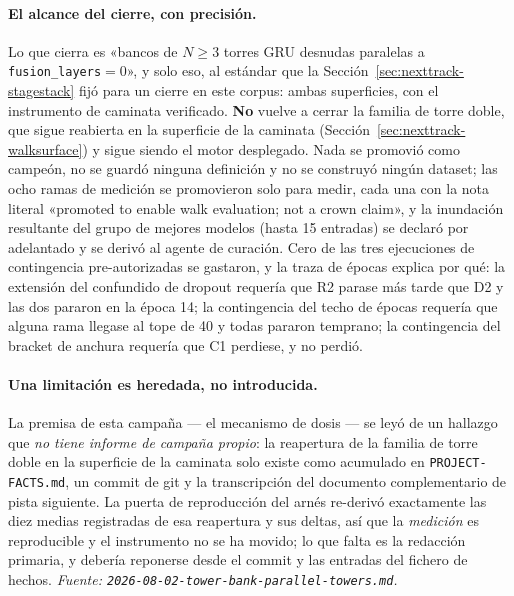\documentclass[11pt]{article}
\begin{document}
\paragraph{El alcance del cierre, con precisión.} Lo que cierra es «bancos de
$N\ge3$ torres GRU desnudas paralelas a \texttt{fusion\_layers}${}=0$», y solo
eso, al estándar que la Sección~\ref{sec:nexttrack-stagestack} fijó para un
cierre en este corpus: ambas superficies, con el instrumento de caminata
verificado. \textbf{No} vuelve a cerrar la familia de torre doble, que sigue
reabierta en la superficie de la caminata
(Sección~\ref{sec:nexttrack-walksurface}) y sigue siendo el motor desplegado. Nada se promovió como campeón, no se guardó ninguna
definición y no se construyó ningún dataset; las ocho ramas de medición se
promovieron solo para medir, cada una con la nota literal «promoted to enable walk
evaluation; not a crown claim», y la inundación resultante del grupo de mejores
modelos (hasta \num{15} entradas) se declaró por adelantado y se derivó al agente
de curación. Cero de las tres ejecuciones de contingencia pre-autorizadas se
gastaron, y la traza de épocas explica por qué: la extensión del confundido de
dropout requería que R2 parase más tarde que D2 y las dos pararon en la época
\num{14}; la contingencia del techo de épocas requería que alguna rama llegase al
tope de \num{40} y todas pararon temprano; la contingencia del bracket de anchura
requería que C1 perdiese, y no perdió.

\paragraph{Una limitación es heredada, no introducida.} La premisa de esta campaña
--- el mecanismo de dosis --- se leyó de un hallazgo que \emph{no tiene informe de
campaña propio}: la reapertura de la familia de torre doble en la superficie de la
caminata solo existe como acumulado en \texttt{PROJECT-FACTS.md}, un commit de git
y la transcripción del documento complementario de pista siguiente.
La puerta de reproducción del arnés re-derivó exactamente las diez medias
registradas de esa reapertura y sus deltas, así que la \emph{medición} es
reproducible y el instrumento no se ha movido; lo que falta es la redacción
primaria, y debería reponerse desde el commit y las entradas del fichero de
hechos.
\emph{Fuente: \texttt{2026-08-02-tower-bank-parallel-towers.md}.}
\end{document}
